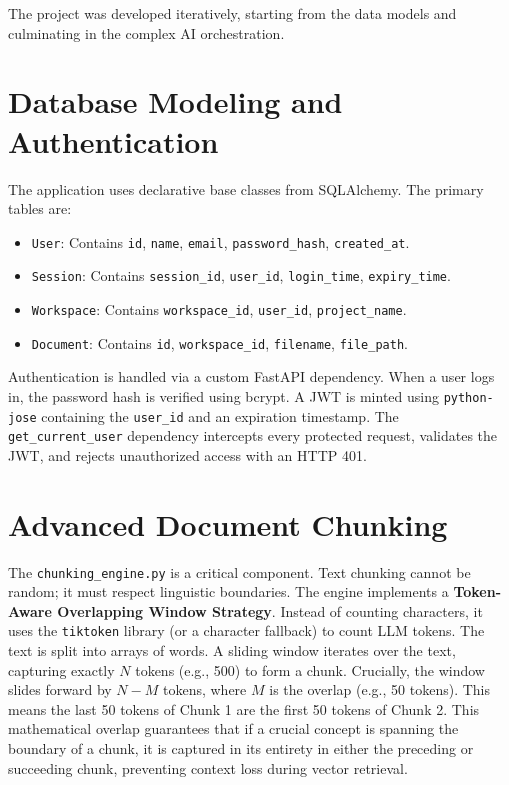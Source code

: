 \documentclass[12pt, a4paper]{report}
\begin{document}
The project was developed iteratively, starting from the data models and culminating in the complex AI orchestration.

\section{Database Modeling and Authentication}
The application uses declarative base classes from SQLAlchemy. The primary tables are:
\begin{itemize}
    \item \texttt{User}: Contains \texttt{id}, \texttt{name}, \texttt{email}, \texttt{password\_hash}, \texttt{created\_at}.
    \item \texttt{Session}: Contains \texttt{session\_id}, \texttt{user\_id}, \texttt{login\_time}, \texttt{expiry\_time}.
    \item \texttt{Workspace}: Contains \texttt{workspace\_id}, \texttt{user\_id}, \texttt{project\_name}.
    \item \texttt{Document}: Contains \texttt{id}, \texttt{workspace\_id}, \texttt{filename}, \texttt{file\_path}.
\end{itemize}
Authentication is handled via a custom FastAPI dependency. When a user logs in, the password hash is verified using bcrypt. A JWT is minted using \texttt{python-jose} containing the \texttt{user\_id} and an expiration timestamp. The \texttt{get\_current\_user} dependency intercepts every protected request, validates the JWT, and rejects unauthorized access with an HTTP 401.

\section{Advanced Document Chunking}
The \texttt{chunking\_engine.py} is a critical component. Text chunking cannot be random; it must respect linguistic boundaries. The engine implements a \textbf{Token-Aware Overlapping Window Strategy}.
Instead of counting characters, it uses the \texttt{tiktoken} library (or a character fallback) to count LLM tokens. The text is split into arrays of words. A sliding window iterates over the text, capturing exactly $N$ tokens (e.g., 500) to form a chunk. Crucially, the window slides forward by $N - M$ tokens, where $M$ is the overlap (e.g., 50 tokens). This means the last 50 tokens of Chunk 1 are the first 50 tokens of Chunk 2. This mathematical overlap guarantees that if a crucial concept is spanning the boundary of a chunk, it is captured in its entirety in either the preceding or succeeding chunk, preventing context loss during vector retrieval.
\end{document}
